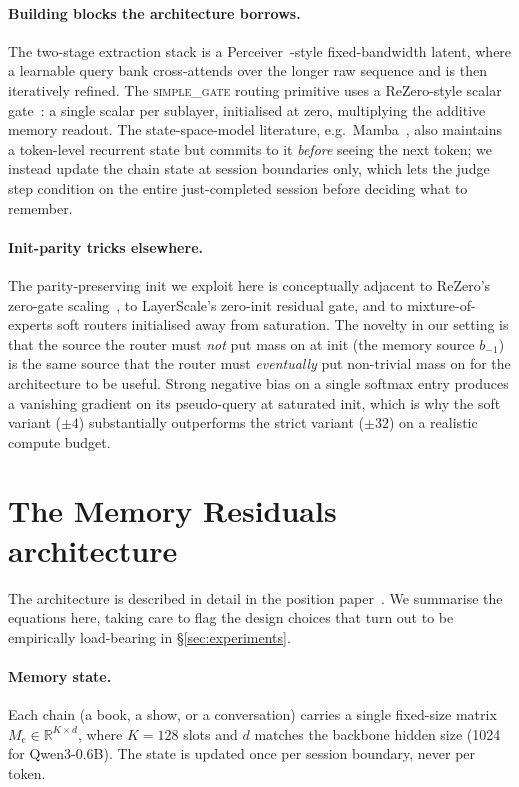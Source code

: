 \documentclass{article}
\newcommand{\Mc}{M_{\text{c}}}
\begin{document}
\paragraph{Building blocks the architecture borrows.} The two-stage
extraction stack is a Perceiver~\cite{jaegle2021perceiver}-style
fixed-bandwidth latent, where a learnable query bank cross-attends
over the longer raw sequence and is then iteratively refined. The
\textsc{simple\_gate} routing primitive uses a ReZero-style scalar
gate~\cite{bachlechner2021rezero}: a single scalar per sublayer,
initialised at zero, multiplying the additive memory readout. The
state-space-model literature, e.g.\ Mamba~\cite{gu2023mamba}, also
maintains a token-level recurrent state but commits to it
\emph{before} seeing the next token; we instead update the chain
state at session boundaries only, which lets the judge step
condition on the entire just-completed session before deciding
what to remember.

\paragraph{Init-parity tricks elsewhere.}
The parity-preserving init we exploit here is conceptually
adjacent to ReZero's zero-gate scaling~\cite{bachlechner2021rezero},
to LayerScale's zero-init residual gate, and to mixture-of-experts
soft routers initialised away from saturation.  The novelty in our
setting is that the source the router must \emph{not} put mass on at
init (the memory source $b_{-1}$) is the same source that the router
must \emph{eventually} put non-trivial mass on for the architecture
to be useful.  Strong negative bias on a single softmax entry
produces a vanishing gradient on its pseudo-query at saturated
init, which is why the soft variant ($\pm 4$) substantially
outperforms the strict variant ($\pm 32$) on a realistic compute
budget.

\section{The Memory Residuals architecture}
\label{sec:method}

The architecture is described in detail in the position
paper~\cite{anon2025memres}. We summarise the equations here, taking
care to flag the design choices that turn out to be empirically
load-bearing in \S\ref{sec:experiments}.

\paragraph{Memory state.} Each chain (a book, a show, or a
conversation) carries a single fixed-size matrix
$\Mc \in \mathbb{R}^{K \times d}$, where $K = 128$ slots and $d$
matches the backbone hidden size (1024 for Qwen3-0.6B). The state is
updated once per session boundary, never per token.
\end{document}
